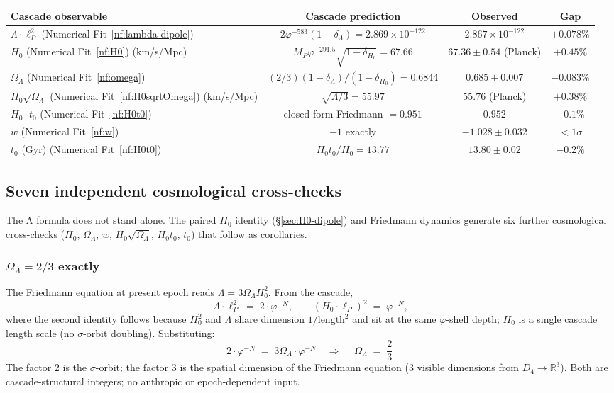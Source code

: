 \documentclass[11pt]{article}
\theoremstyle{plain}
\theoremstyle{definition}
\theoremstyle{remark}
\begin{document}
\begin{center}
\renewcommand{\arraystretch}{1.25}
\begin{tabular}{lccc}
\toprule
Cascade observable & Cascade prediction & Observed & Gap \\
\midrule
$\Lambda \cdot \ell_P^2$ (Numerical Fit~\ref{nf:lambda-dipole}) & $2 \varphi^{-583}(1-\delta_\Lambda) = 2.869 \times 10^{-122}$ & $2.867 \times 10^{-122}$ & $+0.078\%$ \\
$H_0$ (Numerical Fit~\ref{nf:H0}) (km/s/Mpc) & $M_P \varphi^{-291.5}\sqrt{1-\delta_{H_0}} = 67.66$ & $67.36 \pm 0.54$ (Planck) & $+0.45\%$ \\
$\Omega_\Lambda$ (Numerical Fit~\ref{nf:omega}) & $(2/3)(1-\delta_\Lambda)/(1-\delta_{H_0}) = 0.6844$ & $0.685 \pm 0.007$ & $-0.083\%$ \\
$H_0 \sqrt{\Omega_\Lambda}$ (Numerical Fit~\ref{nf:H0sqrtOmega}) (km/s/Mpc) & $\sqrt{\Lambda/3} = 55.97$ & $55.76$ (Planck) & $+0.38\%$ \\
$H_0 \cdot t_0$ (Numerical Fit~\ref{nf:H0t0}) & closed-form Friedmann $= 0.951$ & $0.952$ & $-0.1\%$ \\
$w$ (Numerical Fit~\ref{nf:w}) & $-1$ exactly & $-1.028 \pm 0.032$ & $< 1\sigma$ \\
$t_0$ (Gyr) (Numerical Fit~\ref{nf:H0t0}) & $H_0 t_0 / H_0 = 13.77$ & $13.80 \pm 0.02$ & $-0.2\%$ \\
\bottomrule
\end{tabular}
\end{center}

\subsection{Seven independent cosmological cross-checks}

The Λ formula does not stand alone. The paired $H_0$ identity (\S\ref{sec:H0-dipole}) and Friedmann dynamics generate six further cosmological cross-checks ($H_0$, $\Omega_\Lambda$, $w$, $H_0 \sqrt{\Omega_\Lambda}$, $H_0 t_0$, $t_0$) that follow as corollaries.

\subsubsection{$\Omega_\Lambda = 2/3$ exactly}

The Friedmann equation at present epoch reads $\Lambda = 3 \Omega_\Lambda H_0^2$. From the cascade,
\[
  \Lambda \cdot \ell_P^2 \;=\; 2 \cdot \varphi^{-N}, \qquad (H_0 \cdot \ell_P)^2 \;=\; \varphi^{-N},
\]
where the second identity follows because $H_0^2$ and $\Lambda$ share dimension $1/\text{length}^2$ and sit at the same $\varphi$-shell depth; $H_0$ is a single cascade length scale (no $\sigma$-orbit doubling). Substituting:
\[
  2 \cdot \varphi^{-N} \;=\; 3 \Omega_\Lambda \cdot \varphi^{-N} \quad\Longrightarrow\quad \boxed{\;\Omega_\Lambda \;=\; \frac{2}{3}\;}
\]
The factor 2 is the $\sigma$-orbit; the factor 3 is the spatial dimension of the Friedmann equation (3 visible dimensions from $D_4 \to \mathbb{R}^3$). Both are cascade-structural integers; no anthropic or epoch-dependent input.
\end{document}
